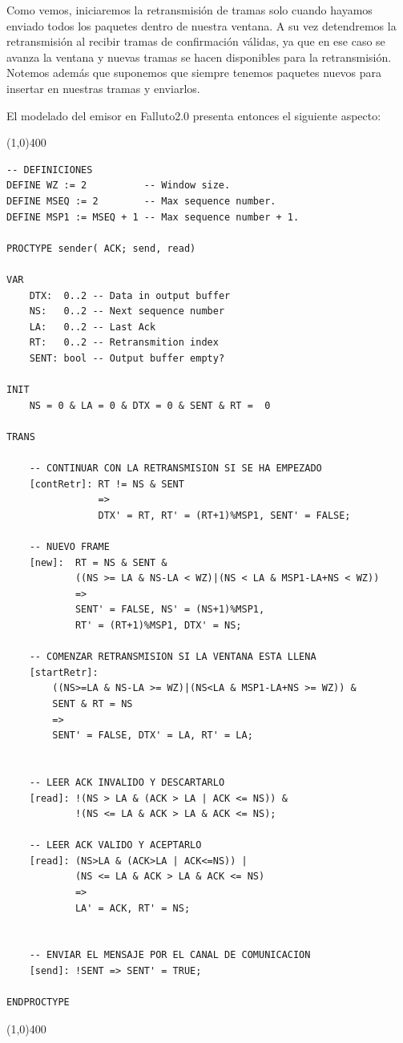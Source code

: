 \documentclass[pdftex,a4paper,12pt]{book}
\begin{document}
Como vemos, iniciaremos la retransmisi\'on de tramas solo cuando hayamos enviado todos los paquetes dentro de nuestra ventana. A su vez detendremos la retransmisi\'on al recibir tramas de confirmaci\'on v\'alidas, ya que en ese caso se avanza la ventana y nuevas tramas se hacen disponibles para la retransmisi\'on. Notemos adem\'as que suponemos que siempre tenemos paquetes nuevos para insertar en nuestras tramas y enviarlos.

El modelado del emisor en Falluto2.0 presenta entonces el siguiente aspecto:

\noindent \line(1,0){400}
\begin{verbatim}
-- DEFINICIONES
DEFINE WZ := 2          -- Window size.
DEFINE MSEQ := 2        -- Max sequence number.
DEFINE MSP1 := MSEQ + 1 -- Max sequence number + 1.

PROCTYPE sender( ACK; send, read)

VAR
    DTX:  0..2 -- Data in output buffer
    NS:   0..2 -- Next sequence number
    LA:   0..2 -- Last Ack
    RT:   0..2 -- Retransmition index
    SENT: bool -- Output buffer empty?

INIT
    NS = 0 & LA = 0 & DTX = 0 & SENT & RT =  0

TRANS

    -- CONTINUAR CON LA RETRANSMISION SI SE HA EMPEZADO
    [contRetr]: RT != NS & SENT 
                => 
                DTX' = RT, RT' = (RT+1)%MSP1, SENT' = FALSE;

    -- NUEVO FRAME 
    [new]:  RT = NS & SENT & 
            ((NS >= LA & NS-LA < WZ)|(NS < LA & MSP1-LA+NS < WZ))
            => 
            SENT' = FALSE, NS' = (NS+1)%MSP1, 
            RT' = (RT+1)%MSP1, DTX' = NS;

    -- COMENZAR RETRANSMISION SI LA VENTANA ESTA LLENA
    [startRetr]: 
        ((NS>=LA & NS-LA >= WZ)|(NS<LA & MSP1-LA+NS >= WZ)) & 
        SENT & RT = NS 
        => 
        SENT' = FALSE, DTX' = LA, RT' = LA;


    -- LEER ACK INVALIDO Y DESCARTARLO
    [read]: !(NS > LA & (ACK > LA | ACK <= NS)) & 
            !(NS <= LA & ACK > LA & ACK <= NS);

    -- LEER ACK VALIDO Y ACEPTARLO
    [read]: (NS>LA & (ACK>LA | ACK<=NS)) |
            (NS <= LA & ACK > LA & ACK <= NS) 
            => 
            LA' = ACK, RT' = NS;


    -- ENVIAR EL MENSAJE POR EL CANAL DE COMUNICACION
    [send]: !SENT => SENT' = TRUE;

ENDPROCTYPE
\end{verbatim}
\noindent \line(1,0){400}\\
\end{document}
